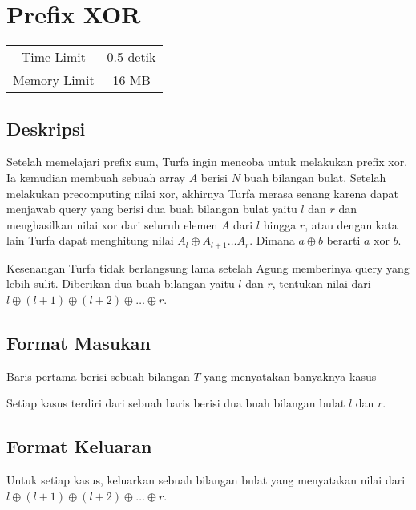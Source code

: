 \documentclass{article}
\begin{document}
\section*{\hfil Prefix XOR\hfil}

\begin{center}
\begin{tabular}{ |cc| } 
 \hline
 Time Limit & 0.5 detik \\ 
 Memory Limit & 16 MB \\
 \hline
\end{tabular}
\end{center}

\subsection*{Deskripsi}
\par Setelah memelajari prefix sum, Turfa ingin mencoba untuk melakukan prefix xor. Ia kemudian membuah sebuah array $A$ berisi $N$ buah bilangan bulat. Setelah melakukan precomputing nilai xor, akhirnya Turfa merasa senang karena dapat menjawab query yang berisi dua buah bilangan bulat yaitu $l$ dan $r$ dan menghasilkan nilai xor dari seluruh elemen $A$ dari $l$ hingga $r$, atau dengan kata lain Turfa dapat menghitung nilai $A_l \oplus A_{l+1} \dots A_r$. Dimana $a \oplus b$ berarti $a$ xor $b$.

\par Kesenangan Turfa tidak berlangsung lama setelah Agung memberinya query yang lebih sulit. Diberikan dua buah bilangan yaitu $l$ dan $r$, tentukan nilai dari $l \oplus (l+1) \oplus (l+2) \oplus \dots \oplus r$.

\subsection*{Format Masukan}
\par Baris pertama berisi sebuah bilangan $T$ yang menyatakan banyaknya kasus
\par Setiap kasus terdiri dari sebuah baris berisi dua buah bilangan bulat $l$ dan $r$.

\subsection*{Format Keluaran}

\par Untuk setiap kasus, keluarkan sebuah bilangan bulat yang menyatakan nilai dari $l \oplus (l+1) \oplus (l+2) \oplus \dots \oplus r$.
\end{document}
